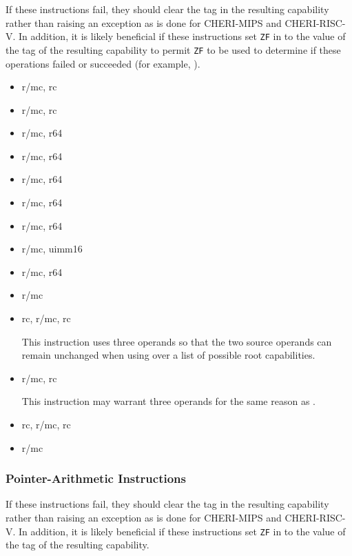 If these instructions fail, they should clear the tag in the resulting
capability rather than raising an exception as is done for CHERI-MIPS
and CHERI-RISC-V.  In addition, it is likely beneficial if these
instructions set \texttt{ZF} in \RFLAGS{} to the value of the tag of
the resulting capability to permit \texttt{ZF} to be used to determine
if these operations failed or succeeded (for example,
).

\begin{itemize}
  \item {} r/mc, rc
  \item {} r/mc, rc
  \item {} r/mc, r64
  \item {} r/mc, r64
  \item {} r/mc, r64
  \item {} r/mc, r64
  \item {} r/mc, r64
  \item {} r/mc, uimm16
  \item {} r/mc, r64
  \item {} r/mc
  \item {} rc, r/mc, rc

    This instruction uses three operands so that the two source operands
    can remain unchanged when using  over a list of
    possible root capabilities.

  \item {} r/mc, rc

    This instruction may warrant three operands for the same reason as
    .

  \item {} rc, r/mc, rc
  \item {} r/mc
\end{itemize}

\subsubsection{Pointer-Arithmetic Instructions}

If these instructions fail, they should clear the tag in the resulting
capability rather than raising an exception as is done for CHERI-MIPS
and CHERI-RISC-V.  In addition, it is likely beneficial if these
instructions set \texttt{ZF} in \RFLAGS{} to the value of the tag of
the resulting capability.

